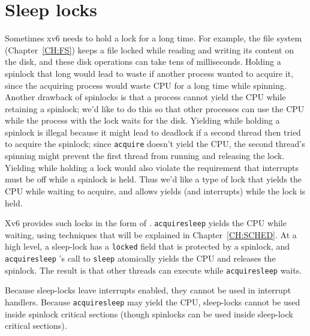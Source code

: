 \section{Sleep locks}


Sometimes xv6 needs to hold a lock for a long time. For example, the
file system (Chapter~\ref{CH:FS}) keeps a file locked while reading
and writing its content on the disk, and these disk operations can
take tens of milliseconds. Holding a spinlock that long would lead to
waste if another process wanted to acquire it, since the acquiring
process would waste CPU for a long time while spinning. Another
drawback of spinlocks is that a process cannot yield the CPU while
retaining a spinlock; we'd like to do this so that other processes can
use the CPU while the process with the lock waits for the disk.
Yielding while holding a spinlock is illegal because it might
lead to deadlock if a second thread then tried to acquire the spinlock;
since {\tt acquire} doesn't yield the CPU, the second thread's
spinning might
prevent the first thread from running and releasing the lock.
Yielding while holding a lock would also violate
the requirement that interrupts must be off while a spinlock is held.
Thus we'd like a type of lock that yields the CPU while waiting to
acquire, and allows yields (and interrupts) while the lock is held.

Xv6 provides such locks in the form of
.
\lstinline{acquiresleep}
yields the CPU while waiting,
using techniques that will be explained in
Chapter~\ref{CH:SCHED}.
At a high level, a sleep-lock has a
\lstinline{locked}
field that is protected by a spinlock, and 
\lstinline{acquiresleep} 's
call to
\lstinline{sleep}
atomically yields the CPU and releases the spinlock.
The result is that other threads can execute while
\lstinline{acquiresleep}
waits.

Because sleep-locks leave interrupts enabled, they cannot be
used in interrupt handlers.
Because
\lstinline{acquiresleep}
may yield the CPU,
sleep-locks cannot be used inside spinlock critical
sections (though spinlocks can be used inside sleep-lock
critical sections).

